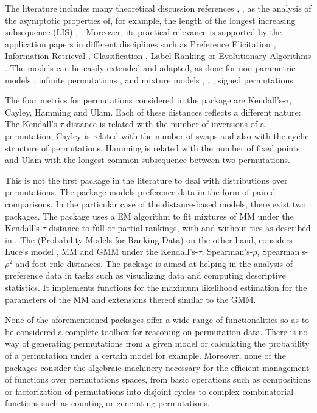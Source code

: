 \documentclass[article,nojss]{jss}
\begin{document}
The literature includes many theoretical discussion references \citep{Fligner1988}, \citep{critchlow91}, \citep{gMallows} as the analysis of the asymptotic properties of, for example, the length of the longest increasing subsequence (LIS) \citep{Mueller2013}, \citep{feray2012}. Moreover, its practical relevance is supported by the application papers in different disciplines such as Preference Elicitation \citep{Chen04}, Information Retrieval \citep{farah}, Classification \citep{Cheng2009}, Label Ranking \citep{conf/isnn/ChengH09} or Evolutionary Algorithms \citep{cebe2011b}. The models can be easily extended and adapted, as done for non-parametric models \citep{Mao2008}, infinite permutations \citep{Gnedin2012615}, \citep{meila08}  and mixture models \citep{D'Elia2005917}, \citep{Meila2010}, \citep{Murphy2003645}, \citep{Lee20122486} signed permutations \citep{DBLP:conf/aistats/AroraM13}

The four metrics for permutations considered in the  package are Kendall's-$\tau$, Cayley, Hamming and Ulam. Each of these distances reflects a different nature: The Kendall's-$\tau$ distance is related with the number of inversions of a permutation, Cayley is related with the number of swaps and also with the cyclic structure of permutations, Hamming is related with the number of fixed points and Ulam with the longest common subsequence between two permutations. 

This is not the first package in the literature to deal with distributions over permutations. The  package \citep{prefmod} models preference data in the form of paired comparisons. In the particular case of the distance-based models, there exist two packages. The  package uses a EM algorithm to fit mixtures of MM under the Kendall's-$\tau$ distance to full or partial rankings, with and without ties as described in \cite{Murphy2003645}. The  (Probability Models for Ranking Data) on the other hand, considers Luce's model \citep{critchlow91}, MM and GMM under the Kendall's-$\tau$, Spearman's-$\rho$,  Spearman's-$\rho^2$  and foot-rule distances. The package is aimed at helping in the analysis of preference data in tasks such as visualizing data and computing descriptive statistics. It implements functions for the maximum likelihood estimation for the parameters of the MM and extensions thereof similar to the GMM.

None of the aforementioned packages offer a wide range of functionalities so as to be considered a complete toolbox for reasoning on permutation data. There is no way of generating permutations from a given model or calculating the probability of a permutation under a certain model for example. Moreover, none of the packages consider the algebraic machinery necessary for the efficient management of functions over permutations spaces, from basic operations such as compositions or factorization of permutations into disjoint cycles to complex combinatorial functions such as counting or generating permutations. 
\end{document}

